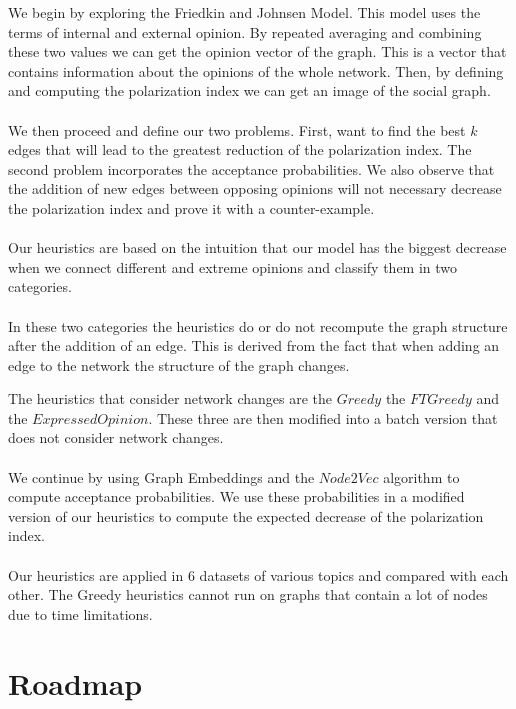 We begin by exploring the Friedkin and Johnsen Model. This model uses the terms of internal and external opinion. By repeated averaging and combining these two values we can get the opinion vector of the graph.
This is a vector that contains information about the opinions of the whole network. Then, by defining and computing the polarization index we can get an image of the social graph.
\\
\\
We then proceed and define our two problems. First, want to find the best $k$ edges that will lead to the greatest reduction of the polarization index. The second problem incorporates the acceptance probabilities.
We also observe that the addition of new edges between opposing opinions will not necessary decrease the polarization index  and prove it with a counter-example.
\\
\\
Our heuristics are based on the intuition that our model has the biggest decrease when we connect different and extreme opinions and classify them in two categories. 
\\
\\
In these two categories the heuristics do or do not recompute the graph structure after the addition of an edge. This is derived from the fact that when adding an edge to the network the structure of the graph changes.

\clearpage


\noindent The heuristics that consider network changes are the $Greedy$ the $FTGreedy$ and the $Expressed Opinion$. These three are then modified into a batch version that does not consider network changes.
\\
\\
We continue by using Graph Embeddings and the $Node2Vec$ algorithm to compute acceptance probabilities. We use these probabilities in a modified version of our heuristics to compute the expected decrease of the polarization index.
\\
\\
Our heuristics are applied in 6 datasets of various topics and compared with each other. The Greedy heuristics cannot run on graphs that contain a lot of nodes due to time limitations.

\section{Roadmap}
\label{sec:roadmap}

